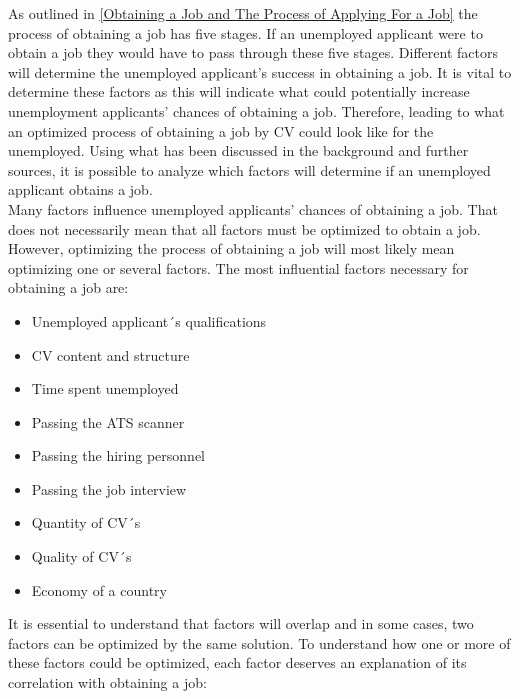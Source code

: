 As outlined in \ref{Obtaining a Job and The Process of Applying For a Job} the process of obtaining a job has five stages.
If an unemployed applicant were to obtain a job they would have to pass through these five stages.
Different factors will determine the unemployed applicant's success in obtaining a job.
It is vital to determine these factors as this will indicate what could potentially increase unemployment applicants' chances of obtaining a job.
Therefore, leading to what an optimized process of obtaining a job by CV could look like for the unemployed.
Using what has been discussed in the background and further sources, it is possible to analyze which factors will determine if an unemployed applicant obtains a job. \\

Many factors influence unemployed applicants' chances of obtaining a job.
That does not necessarily mean that all factors must be optimized to obtain a job.
However, optimizing the process of obtaining a job will most likely mean optimizing one or several factors.
The most influential factors necessary for obtaining a job are: \\
\begin{itemize}
  \item  Unemployed applicant´s qualifications
  \item  CV content and structure
  \item  Time spent unemployed
  \item  Passing the ATS scanner
  \item  Passing the hiring personnel
  \item  Passing the job interview
  \item  Quantity of CV´s 
  \item  Quality of CV´s
  \item  Economy of a country
\end{itemize} 
It is essential to understand that factors will overlap and in some cases, two factors can be optimized by the same solution.
To understand how one or more of these factors could be optimized, each factor deserves an explanation of its correlation with obtaining a job: \\

